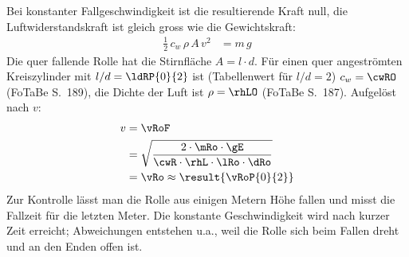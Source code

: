 Bei konstanter Fallgeschwindigkeit ist die resultierende Kraft null, die Luftwiderstandskraft ist gleich gross wie die Gewichtskraft:
\begin{align}
 \frac{1}{2}\,c_w\,\rho\,A\,v^2 &= m\,g
\end{align}
Die quer fallende Rolle hat die Stirnfläche $A = l\cdot d$. Für einen quer angeströmten Kreiszylinder mit $l/d = \ldRP{0}{2}$ ist (Tabellenwert für $l/d = 2$) $c_w = \cwRO$ (FoTaBe S.~189), die Dichte der Luft ist $\rho = \rhLO$ (FoTaBe S.~187). Aufgelöst nach $v$:
\begin{align}
 v &= \vRoF \\
   &= \sqrt{\frac{2\cdot\mRo\cdot\gE}{\cwR\cdot\rhL\cdot\lRo\cdot\dRo}} \\
   &= \vRo \approx \result{\vRoP{0}{2}}
\end{align}
Zur Kontrolle lässt man die Rolle aus einigen Metern Höhe fallen und misst die Fallzeit für die letzten Meter. Die konstante Geschwindigkeit wird nach kurzer Zeit erreicht; Abweichungen entstehen u.a., weil die Rolle sich beim Fallen dreht und an den Enden offen ist.
